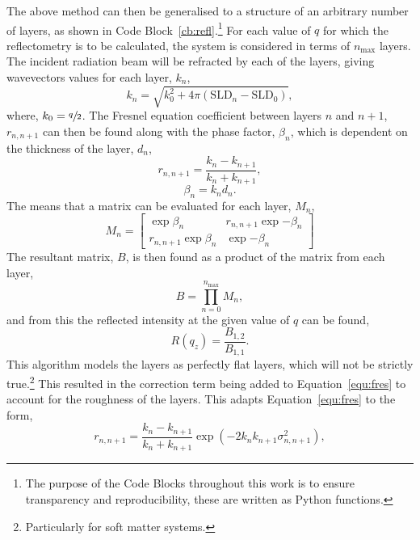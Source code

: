 The above method can then be generalised to a structure of an arbitrary number of layers, as shown in Code Block~\ref{cb:refl}.\footnote{The purpose of the Code Blocks throughout this work is to ensure transparency and reproducibility, these are written as Python functions.}
For each value of $q$ for which the reflectometry is to be calculated, the system is considered in terms of $n_{\text{max}}$ layers.
The incident radiation beam will be refracted by each of the layers, giving wavevectors values for each layer, $k_n$,
%
\begin{equation}
    k_n = \sqrt{k_0^2 + 4\pi (\text{SLD}_n - \text{SLD}_0)},
\end{equation}
%
where, $k_0=\sfrac{q}{2}$.
The Fresnel equation coefficient between layers $n$ and $n+1$, $r_{n,n+1}$ can then be found along with the phase factor, $\beta_n$, which is dependent on the thickness of the layer, $d_n$,
%
\begin{equation}
    r_{n,n+1} = \frac{k_n - k_{n+1}}{k_n + k_{n+1}},
    \label{equ:fres}
\end{equation}
%
%
\begin{equation}
    \beta_n = k_n d_n.
\end{equation}
%
The means that a matrix can be evaluated for each layer, $M_n$,
%
\begin{equation}
    M_n =
    \begin{bmatrix}
        \exp{\beta_n} & r_{n,n+1}\exp{-\beta_n} \\ r_{n,n+1}\exp{\beta_n} & \exp{-\beta_n}
    \end{bmatrix}
\end{equation}
%
The resultant matrix, $B$, is then found as a product of the matrix from each layer,
%
\begin{equation}
    B = \prod_{n=0}^{n_{\text{max}}} M_n,
\end{equation}
%
and from this the reflected intensity at the given value of $q$ can be found,
%
\begin{equation}
    R(q_z) = \frac{B_{1,2}}{B_{1,1}}.
\end{equation}
%
This algorithm models the layers as perfectly flat layers, which will not be strictly true.\footnote{Particularly for soft matter systems.}
This resulted in the correction term being added to Equation~\ref{equ:fres} to account for the roughness of the layers.
This adapts Equation~\ref{equ:fres} to the form,
%
\begin{equation}
    r_{n,n+1} = \frac{k_n - k_{n+1}}{k_n + k_{n+1}}\exp{(-2k_nk_{n+1}\sigma^2_{n,n+1})},
\end{equation}
